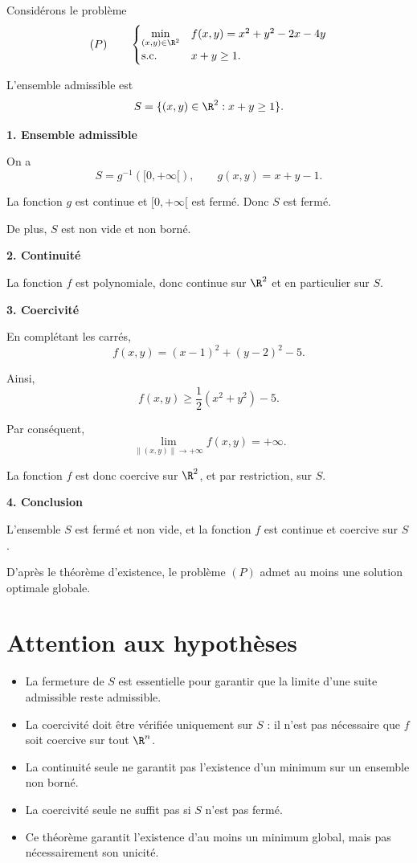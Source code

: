 \begin{exemple}
Considérons le problème
\[
(P)\qquad
\begin{cases}
\displaystyle\min_{(x,y)\in\R^2}
& f(x,y)=x^2+y^2-2x-4y\\
\text{s.c.}
& x+y\geq 1.
\end{cases}
\]

L'ensemble admissible est
\[
S=\{(x,y)\in\R^2:x+y\geq1\}.
\]

\textbf{1. Ensemble admissible}

On a
\[
S=g^{-1}([0,+\infty[),
\qquad g(x,y)=x+y-1.
\]

La fonction $g$ est continue et $[0,+\infty[$ est fermé. Donc $S$ est fermé.

De plus, $S$ est non vide et non borné.

\textbf{2. Continuité}

La fonction $f$ est polynomiale, donc continue sur $\R^2$ et en particulier sur $S$.

\textbf{3. Coercivité}

En complétant les carrés,
\[
f(x,y)=(x-1)^2+(y-2)^2-5.
\]

Ainsi,
\[
f(x,y)\geq \frac12(x^2+y^2)-5.
\]

Par conséquent,
\[
\lim_{\|(x,y)\|\to+\infty}f(x,y)=+\infty.
\]

La fonction $f$ est donc coercive sur $\R^2$, et par restriction, sur $S$.

\textbf{4. Conclusion}

L'ensemble $S$ est fermé et non vide, et la fonction $f$ est continue et coercive sur $S$.

D'après le théorème d'existence, le problème $(P)$ admet au moins une solution optimale globale.
\end{exemple}

\section{Attention aux hypothèses}

\begin{attention}
\begin{itemize}
    \item La fermeture de $S$ est essentielle pour garantir que la limite d'une suite admissible reste admissible.
    \item La coercivité doit être vérifiée uniquement sur $S$ : il n'est pas nécessaire que $f$ soit coercive sur tout $\R^n$.
    \item La continuité seule ne garantit pas l'existence d'un minimum sur un ensemble non borné.
    \item La coercivité seule ne suffit pas si $S$ n'est pas fermé.
    \item Ce théorème garantit l'existence d'au moins un minimum global, mais pas nécessairement son unicité.
\end{itemize}
\end{attention}
